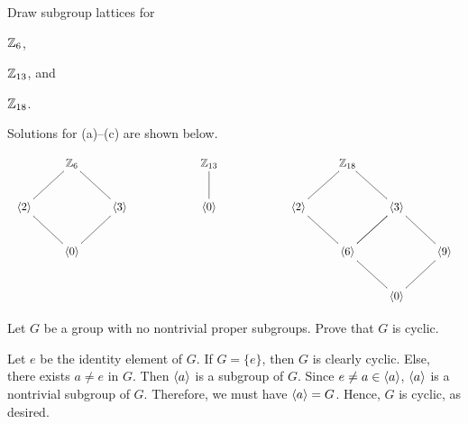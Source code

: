 \begin{exercise}
Draw subgroup lattices for \begin{inparaenum}[(a)]
\item $\mathbb{Z}_6$,
\item $\mathbb{Z}_{13}$, and
\item $\mathbb{Z}_{18}$.
\end{inparaenum}
\end{exercise}

\begin{solution}[print=false]
Solutions for (a)--(c) are shown below.

$$\begin{array}{lll}\xymatrix{&\Z_6&\\\<2\>\ar@{-}[ur]&&\<3\>\ar@{-}[ul]\\&\<0\>\ar@{-}[ul]\ar@{-}[ur]&}& \hspace{50pt}
\xymatrix{\Z_{13}\ar@{-}[d]\\ \<0\>}& \hspace{50pt}  \xymatrix{&\Z_{18}&&\\\<2\>\ar@{-}[ur]\ar@{-}[dr]&&\<3\>\ar@{-}[ul]\ar@{-}[dl]&\\
&\<6\>\ar@{-}[dr]\ar@{-}[ur]&&\<9\>\ar@{-}[dl]\ar@{-}[ul]\\&&\<0\>&}\end{array}$$
\end{solution}

\begin{exercise}
Let $G$ be a group with no nontrivial proper subgroups.  Prove that $G$ is cyclic.
\end{exercise}

\begin{solution}[print=false]
 Let $e$ be the identity
    element of $G$. If $G=\{e\}$, then $G$ is clearly
    cyclic. Else, there exists $a\neq e$ in $G$. Then
    $\langle a\rangle$ is a subgroup of $G$.  Since $e\neq a\in
    \langle a\rangle$, $\langle a\rangle$ is a nontrivial subgroup of $G$. Therefore, we must have
    $\langle a\rangle=G$. Hence, $G$ is cyclic, as desired.
\end{solution} 